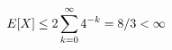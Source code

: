 \documentclass[preview]{standalone}
\begin{document}
\begin{align*}
\special{dvisvgm:raw <g id='unique000'>}E[X]\le2\sum_{k=0}^{\infty}4^{-k}=8/3<\infty\special{dvisvgm:raw </g>}
\end{align*}
\end{document}
